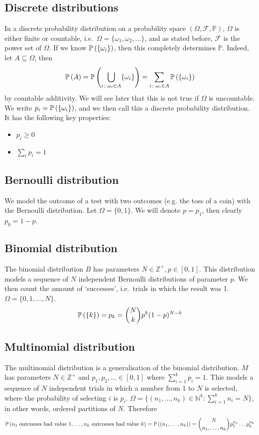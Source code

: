 \subsection{Discrete distributions}
In a discrete probability distribution on a probability space \((\Omega, \mathcal F, \mathbb P)\), \(\Omega\) is either finite or countable, i.e.\ \(\Omega = \{ \omega_1, \omega_2, \dots \}\), and as stated before, \(\mathcal F\) is the power set of \(\Omega\).
If we know \(\mathbb{P}\left({\{\omega_i\}}\right)\), then this completely determines \(\mathbb P\).
Indeed, let \(A \subseteq \Omega\), then
\[
	\mathbb{P}\left({A}\right) = \mathbb{P}\left({\bigcup_{i \colon \omega_i \in A} \{ \omega_i \}}\right) = \sum_{i \colon \omega_i \in A}\mathbb{P}\left({\{\omega_i\}}\right)
\]
by countable additivity.
We will see later that this is not true if \(\Omega\) is uncountable.
We write \(p_i = \mathbb{P}\left({\{\omega_i\}}\right)\), and we then call this a discrete probability distribution.
It has the following key properties:
\begin{itemize}
	\item \(p_i \geq 0\)
	\item \(\sum_i p_i = 1\)
\end{itemize}

\subsection{Bernoulli distribution}
We model the outcome of a test with two outcomes (e.g.
the toss of a coin) with the Bernoulli distribution.
Let \(\Omega = \{ 0, 1 \}\).
We will denote \(p = p_1\), then clearly \(p_0 = 1 - p\).

\subsection{Binomial distribution}
The binomial distribution \(B\) has parameters \(N \in \mathbb Z^+, p \in [0, 1]\).
This distribution models a sequence of \(N\) independent Bernoulli distributions of parameter \(p\).
We then count the amount of `successes', i.e.\ trials in which the result was 1.
\(\Omega = \{ 0, 1, \dots, N \}\).
\[
	\mathbb{P}\left({\{ k \}}\right) = p_k = \binom{N}{k}p^k(1-p)^{N-k}
\]

\subsection{Multinomial distribution}
The multinomial distribution is a generalisation of the binomial distribution.
\(M\) has parameters \(N \in \mathbb Z^+\) and \(p_1, p_2, \dots \in [0, 1]\) where \(\sum_{i=1}^k p_i = 1\).
This models a sequence of \(N\) independent trials in which a number from 1 to \(N\) is selected, where the probability of selecting \(i\) is \(p_i\).
\(\Omega = \{ (n_1, \dots, n_k) \in \mathbb N^k \colon \sum_{i=1}^k n_i = N \}\), in other words, ordered partitions of \(N\).
Therefore
\[
	\mathbb{P}\left({n_1 \text{ outcomes had value 1}, \dots, n_k \text{ outcomes had value }k}\right) = \mathbb{P}\left({(n_1, \dots, n_k)}\right) = \binom{N}{n_1,\dots,n_k}p_1^{n_1}\dots p_k^{n_k}
\]

